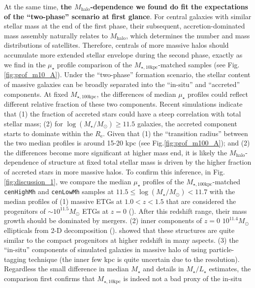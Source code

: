 \documentclass{emulateapj}
\def\rbcg{\texttt{cenHighMh}}
\def\nbcg{\texttt{cenLowMh}}
\def\mstar{{$M_{\star}$}}
\def\mhalo{{$M_{\mathrm{halo}}$}}
\def\logms{{$\log (M_{\star}/M_{\odot})$}}
\def\minn{{$M_{\star,10\mathrm{kpc}}$}}
\def\mtot{{$M_{\star,100\mathrm{kpc}}$}}
\def\m2l{{$M_{\star}/L_{\star}$}}
\def\mden{{$\mu_{\star}$}}
\begin{document}
\begin{CJK*}{UTF8}{gbsn}
    At the same time, \textbf{the \mhalo{}-dependence we found do fit the expectations 
    of the ``two-phase'' scenario at first glance}. 
    For central galaxies with similar stellar mass at the end of the first phase, 
    their subsequent, accretion-dominated mass assembly naturally relates to \mhalo{}, 
    which determines the number and mass distributions of satellites. 
    Therefore, centrals of more massive halos should accumulate more extended stellar 
    envelope during the second phase, exactly as we find in the \mden{} profile 
    comparison of the \minn{}-matched samples (see Fig.\ref{fig:prof_m10_A}).
    Under the ``two-phase'' formation scenario, the stellar content of massive galaxies
    can be broadly separated into the ``in-situ'' and ``accreted'' components. 
    At fixed \mtot{}, the differences of median \mden{} profiles could reflect 
    different relative fraction of these two components. 
    Recent simulations indicate that (1) the fraction of accreted stars could have 
    a steep correlation with total stellar mass; (2) for \logms$\geq 11.5$ galaxies,
    the accreted component starts to dominate within the $R_{\mathrm{e}}$.  
    Given that (1) the ``transition radius'' between the two median profiles is around
    15-20 kpc (see Fig.\ref{fig:prof_m100_A}); and (2) the differences become more 
    significant at higher mass end, it is likely the \mhalo{}-dependence of structure
    at fixed total stellar mass is driven by the higher fraction of accreted stars 
    in more massive halos.  
    To confirm this inference, in Fig.\ref{fig:discussion_1}, we compare the median 
    \mden{} profiles of the \mtot{}-matched \rbcg{} and \nbcg{} samples at 
    $11.5\leq$\logms{}$<11.7$ with the median profiles of 
    (1) massive ETGs at $1.0 < z < 1.5$ that are considered the progenitors of 
    $\sim 10^{11.5} M_{\odot}$ ETGs at $z=0$ (\citealt{Patel2013}).  
    After this redshift range, their mass growth should be dominated by mergers.  
    (2) inner components of $z=0$ $10^{11.4} M_{\odot}$ ellipticals from 2-D decomposition
    (\citealt{Huang2013a}). 
    \citep{Huang2013b} showed that these structures are quite similar to the compact 
    progenitors at higher redshift in many aspects.  
    (3) the ``in-situ'' components of simulated galaxies in massive halo of 
    \citep{Cooper13} using particle-tagging technique (the inner few kpc is quite 
    uncertain due to the resolution).  
    Regardless the small difference in median \mstar{} and details in \m2l{} estimates, 
    the comparison first confirms that \minn{} is indeed not a bad proxy of the in-situ 

\end{CJK*}
\end{document}
